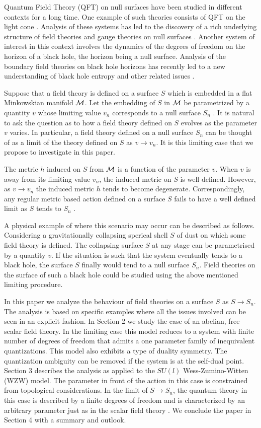 \documentclass[a4paper,12pt]{article}
\begin{document}
Quantum Field Theory (QFT) on null surfaces have been studied in different
contexts for a long time.
One example of such theories consists of
QFT on the light cone \cite{dirac}. Analysis of these
systems has led to the discovery of a rich underlying structure of field
theories and gauge theories on null surfaces \cite{hari}.
Another system of interest in this context involves the dynamics of the
degrees of freedom on the horizon of a black hole, 
the  horizon being a null surface.
Analysis of the boundary field theories on black hole horizons has
recently led to a new understanding of black hole entropy and other related
issues \cite{bh}.

Suppose that a field theory is defined on a surface $S$ which is embedded in
a flat Minkowskian manifold ${\cal M}$.
Let the embedding of $S$ in ${\cal M}$ be parametrized by a quantity
$v$
whose limiting value $v_{n}$ corresponds to a null surface
 $S_n$ .  It is natural to ask the question as to how a field theory 
defined on $S$ evolves as the parameter $v$ varies. In particular,
a field theory defined  on a null surface $S_n$ can be 
thought of as a limit of the theory defined on $S$ as 
$v  \rightarrow v_n$. It is this limiting case that we propose
to investigate in this paper.

The metric $h$ induced on $S$ from ${\cal M}$ is a function of 
the parameter $v$. When $v$ is
away from its limiting value $v_n$, 
the induced metric on $S$ is well defined.
However, as $v  \rightarrow v_n$
the induced metric $h$ tends to become degenerate. 
Correspondingly, any regular metric based action
defined on a surface $S$ fails to have a well defined limit
as $S$ tends to $S_n$ . 

A physical example of where this scenario may occur 
can be described as follows.
Considering a gravitationally collapsing sperical shell $S$ 
of dust on which some field theory
is defined. The collapsing surface $S$ at any stage can be parametrised by 
a quantity $v$. If the situation is such that the system eventually
tends to a black hole, the surface $S$ finally would tend to a null surface
$S_n$. Field theories on the surface of such a black hole could be studied
using the above mentioned limiting procedure. 

In this paper we analyze the behaviour of field theories on a 
surface $S$ as $S \rightarrow S_n$.
The analysis  is based on specific examples where 
all the issues involved can be seen in an explicit
fashion. In Section 2 we study the case of an 
abelian, free scalar field theory.
In the limiting case this model reduces to a system with finite number of
degrees of freedom that admits a one parameter family of inequivalent
quantizations. This model also exhibits a type of duality symmetry. 
The quantization ambiguity can be removed if the system is at the self-dual
point.
Section 3 describes the analysis as applied to the  $SU(l)$  
Wess-Zumino-Witten (WZW) model. The parameter in front of the action in this
case is constrained from topological considerations. 
In the limit of $S \rightarrow S_n$, 
the  quantum theory in this case is  described by a finite
 degrees of freedom and is characterized by an arbitrary
 parameter just as in the scalar field theory . We
 conclude the paper in Section 4 with a summary and outlook.
\end{document}
